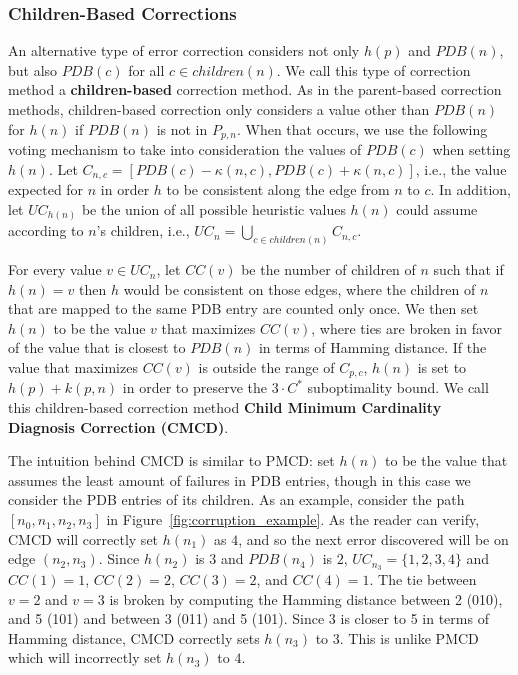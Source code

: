 \documentclass{article}
\begin{document}
\subsubsection{Children-Based Corrections}

An alternative type of error correction considers not only $h(p)$ and $PDB(n)$, but also $PDB(c)$ for all $c \in children(n)$. We call this type of correction method a \textbf{children-based} correction method. 
%
As in the parent-based correction methods, children-based correction only considers a value other than $PDB(n)$ for $h(n)$ if $PDB(n)$ is not in $P_{p,n}$. When that occurs, we use the following voting mechanism to take into consideration the values of $PDB(c)$ when setting $h(n)$. 
Let $C_{n,c}=[PDB(c)-\kappa(n,c),PDB(c)+\kappa(n,c)]$, i.e., the value expected for $n$ in order $h$ to be consistent along the edge from $n$ to $c$. In addition, let $UC_{h(n)}$ be the union of all possible heuristic values $h(n)$ could assume according to $n$'s children, i.e., $UC_n = \bigcup_{c \in children(n)} C_{n,c}$.

For every value $v\in UC_n$, let $CC(v)$ be the number of children of $n$ such that if $h(n)=v$ then $h$ would be consistent on those edges, where the children of $n$ that are mapped to the same PDB entry are counted only once. We then set $h(n)$ to be the value $v$ that maximizes $CC(v)$, where ties are broken in favor of the value that is closest to $PDB(n)$ in terms of Hamming distance.
If the value that maximizes $CC(v)$ is outside the range of $C_{p,c}$, $h(n)$ is set to $h(p) + k(p, n)$ in order to preserve the $3 \cdot C^*$ suboptimality bound.
We call this children-based correction method \textbf{Child Minimum Cardinality Diagnosis Correction (CMCD)}. 

The intuition behind CMCD is similar to PMCD: set $h(n)$ to be the value that assumes the least amount of failures in PDB entries, though in this case we consider the PDB entries of its children. 
As an example, consider the path $[n_0, n_1, n_2, n_3]$ in Figure~\ref{fig:corruption_example}.
As the reader can verify, CMCD will correctly set $h(n_1)$ as $4$, and so the next error discovered will be on edge $(n_2, n_3)$. 
Since $h(n_2)$ is $3$  and $PDB(n_4)$ is $2$, $UC_{n_3} = \{1, 2, 3, 4\}$ and $CC(1)=1$, $CC(2)=2$, $CC(3)=2$, and $CC(4)=1$.
The tie between $v=2$ and $v=3$ is broken by computing the Hamming distance between 2 (010), and 5 (101) and between 3 (011) and 5 (101). Since 3 is closer to 5 in terms of Hamming distance, CMCD correctly sets $h(n_3)$ to $3$.
This is unlike PMCD which will incorrectly set $h(n_3)$ to $4$.
\end{document}

